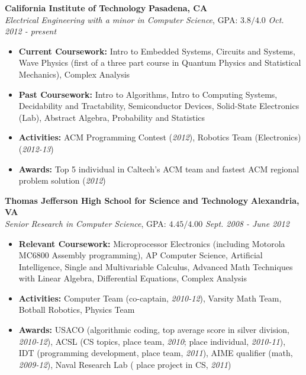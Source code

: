 \documentclass{article}
\newenvironment{changemargin}[2]{%
  \begin{list}{}{%
    \setlength{\topsep}{0pt}%
    \setlength{\leftmargin}{#1}%
    \setlength{\rightmargin}{#2}%
    \setlength{\listparindent}{\parindent}%
    \setlength{\itemindent}{\parindent}%
    \setlength{\parsep}{\parskip}%
  }%
  \item[]}{\end{list}
}
\newenvironment{body} {
	\vspace*{-16pt}
	\begin{changemargin}{-0.25in}{-0.5in}
  }	
	{\end{changemargin}
}
\begin{document}
\begin{body}
	\vspace{14pt}
	\textbf{California Institute of Technology} \hfill \textbf{Pasadena, CA}{} \\
	\emph{Electrical Engineering with a minor in Computer Science}, GPA: $3.8/4.0$ \hfill \emph{Oct. 2012 - present} \\
	\begin{itemize}
	\item \textbf{Current Coursework:} Intro to Embedded Systems, Circuits and Systems, Wave Physics (first of a three part course in Quantum Physics and Statistical Mechanics), Complex Analysis
	\item \textbf{Past Coursework:} Intro to Algorithms, Intro to Computing Systems, Decidability and Tractability, Semiconductor Devices, Solid-State Electronics (Lab), Abstract Algebra, Probability and Statistics
	\item \textbf{Activities:} ACM Programming Contest (\textit{2012}), Robotics Team (Electronics) (\textit{2012-13})
	\item \textbf{Awards:} Top 5 individual in Caltech's ACM team and fastest ACM regional problem solution (\textit{2012})
	\end{itemize}

	\medskip

	\textbf{Thomas Jefferson High School for Science and Technology} \hfill \textbf{Alexandria, VA} \\
	\emph{Senior Research in Computer Science}, GPA: $4.45/4.00$ \hfill \emph{Sept. 2008 - June 2012} \\
	\begin{itemize}
	\item \textbf{Relevant Coursework:} Microprocessor Electronics (including Motorola MC6800 Assembly programming), AP Computer Science, Artificial Intelligence, Single and Multivariable Calculus, Advanced Math Techniques with Linear Algebra, Differential Equations, Complex Analysis
	\item \textbf{Activities:} Computer Team (co-captain, \textit{2010-12}), Varsity Math Team, Botball Robotics, Physics Team
	\item \textbf{Awards:} USACO (algorithmic coding, top average score in silver division, \textit{2010-12}), ACSL (CS topics,  place team, \textit{2010};  place individual, \textit{2010-11}), IDT (programming development,  place team, \textit{2011}), AIME qualifier (math, \textit{2009-12}), Naval Research Lab ( place project in CS, \textit{2011})
	\end{itemize}
\end{body}
\end{document}
